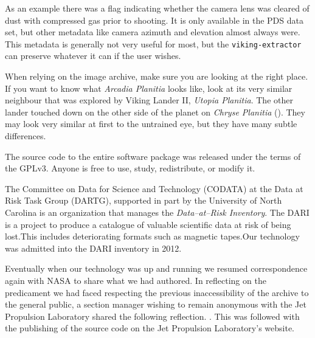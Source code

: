 As an example there was a flag indicating whether the camera lens was cleared of dust with compressed gas prior to shooting. It is only available in the PDS data set, but other metadata like camera azimuth and elevation almost always were. This metadata is generally not very useful for most, but the {\tt viking-extractor} can preserve whatever it can if the user wishes.

When relying on the image archive, make sure you are looking at the right place. If you want to know what {\it Arcadia Planitia} looks like, look at its very similar neighbour that was explored by Viking Lander II, {\it Utopia Planitia}. The other lander touched down on the other side of the planet on {\it Chryse Planitia} (). They may look very similar at first to the untrained eye, but they have many subtle differences.

The source code to the entire software package was released under the terms of the GPLv3. Anyone is free to use, study, redistribute, or modify it.

    {}


The Committee on Data for Science and Technology (CODATA) at the Data at Risk Task Group (DARTG), supported in part by the University of North Carolina is an organization that manages the {\it Data--at--Risk Inventory}. The DARI is a project to produce a catalogue of valuable scientific data at risk of being lost.\footnotecite[murillo2012] This includes deteriorating formats such as magnetic tapes. Our technology was admitted into the DARI inventory in 2012.

Eventually when our technology was up and running we resumed correspondence again with NASA to share what we had authored. In reflecting on the predicament we had faced respecting the previous inaccessibility of the archive to the general public, a section manager wishing to remain anonymous with the Jet Propulsion Laboratory shared the following reflection. . This was followed with the publishing of the source code on the Jet Propulsion Laboratory's website.

